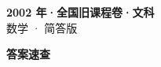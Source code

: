 \documentclass[zihao=-4, a4paper]{ctexart}
\begin{document}
\begin{center}
  {\Large\bfseries 2002 年·全国旧课程卷·文科}\\[4pt]
  {\large 数学 · 简答版}
\end{center}
\medskip
{}

\clearpage
{}
\begin{center}{\Large\bfseries 答案速查}\end{center}
\medskip

\end{document}
